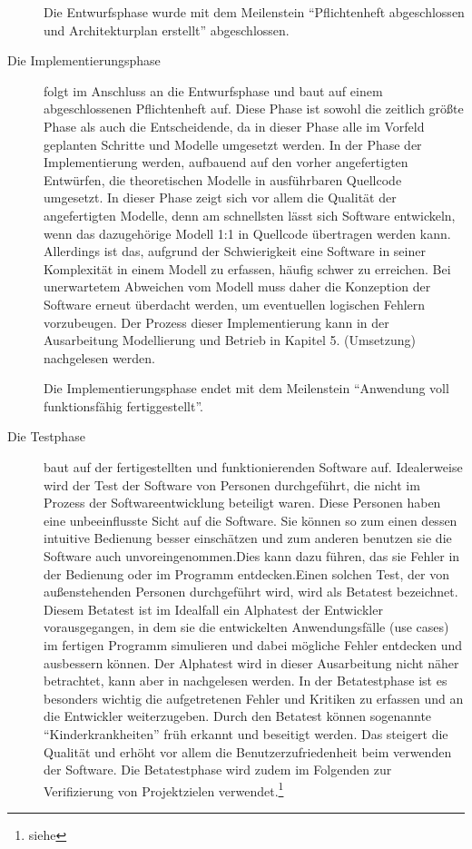\begin{description}
  Die Entwurfsphase wurde mit dem Meilenstein "`Pflichtenheft abgeschlossen und
  Architekturplan erstellt"' abgeschlossen.

  \item[Die Implementierungsphase] folgt im Anschluss an die Entwurfsphase und
  baut auf einem abgeschlossenen Pflichtenheft auf. Diese Phase ist sowohl die
  zeitlich größte Phase als auch die Entscheidende, da in dieser Phase alle im
  Vorfeld geplanten Schritte und Modelle umgesetzt werden. In der Phase der
  Implementierung werden, aufbauend auf den vorher angefertigten Entwürfen, die
  theoretischen Modelle in ausführbaren Quellcode umgesetzt. In dieser Phase
  zeigt sich vor allem die Qualität der angefertigten Modelle, denn am
  schnellsten lässt sich Software entwickeln, wenn das dazugehörige Modell
  1:1 in Quellcode übertragen werden kann. Allerdings ist das, aufgrund der
  Schwierigkeit eine Software in seiner Komplexität in einem Modell zu erfassen,
  häufig schwer zu erreichen. Bei unerwartetem Abweichen vom Modell muss daher
  die Konzeption der Software erneut überdacht werden, um eventuellen logischen
  Fehlern vorzubeugen. Der Prozess dieser Implementierung kann in der
  Ausarbeitung Modellierung und Betrieb in Kapitel 5. (Umsetzung) nachgelesen werden.

  Die Implementierungsphase endet mit dem Meilenstein "`Anwendung voll
  funktionsfähig fertiggestellt"'.

  \item[Die Testphase] baut auf der fertigestellten und funktionierenden Software auf.
  Idealerweise wird der Test der Software von Personen durchgeführt, die nicht im Prozess der
  Softwareentwicklung beteiligt waren. Diese Personen haben eine
  unbeeinflusste Sicht auf die Software. Sie können so zum einen dessen
  intuitive Bedienung besser einschätzen und zum anderen benutzen sie die Software auch
  unvoreingenommen.Dies kann dazu führen, das sie Fehler in der Bedienung oder
  im Programm entdecken.Einen solchen Test, der von außenstehenden Personen
  durchgeführt wird, wird als Betatest bezeichnet. Diesem Betatest ist im
  Idealfall ein Alphatest der Entwickler vorausgegangen, in dem sie die entwickelten Anwendungsfälle (use cases) im fertigen Programm simulieren und dabei mögliche
  Fehler entdecken und ausbessern können. Der Alphatest wird in dieser Ausarbeitung nicht näher betrachtet,
  kann aber in \citet{modelierungUndBetrieb2014} nachgelesen werden.
  In der Betatestphase ist es besonders wichtig die  aufgetretenen Fehler
  und Kritiken zu erfassen und an die Entwickler weiterzugeben. Durch den
  Betatest können sogenannte "`Kinderkrankheiten"' früh erkannt und beseitigt
  werden. Das steigert die Qualität und erhöht vor allem die
  Benutzerzufriedenheit beim verwenden der Software. Die Betatestphase wird zudem im Folgenden
  zur Verifizierung von Projektzielen verwendet.\footnote{siehe
  }


\end{description}
